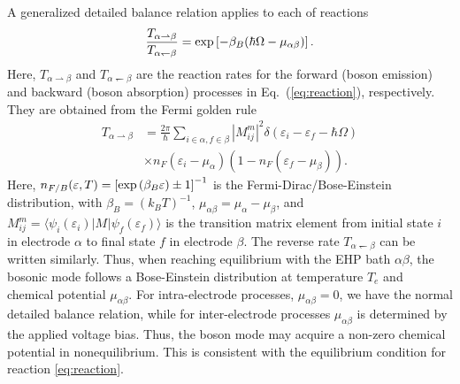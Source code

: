 \documentclass[aps,prb,
,floatfix,footinbib,shortbibliography,
preprint
]{revtex4-1}
\begin{document}
A generalized detailed balance relation applies to each of reactions
\begin{align}
\frac{T_{\alpha\rightharpoonup\beta}}{T_{\alpha\leftharpoondown\beta}} = {\rm exp}\left[-\beta_B(\hbar\Omega-\mu_{\alpha\beta})\right].
\label{eq:db}
\end{align}
Here, $T_{\alpha\rightharpoonup\beta}$ and $T_{\alpha\leftharpoondown\beta}$ are the reaction rates for the forward (boson emission) and backward (boson absorption) processes in Eq.~(\ref{eq:reaction}), respectively. They are obtained from the Fermi golden rule
\begin{align}
T_{\alpha\rightharpoonup\beta} &= \frac{2\pi}{\hbar}\sum_{i\in\alpha,f\in\beta}|M^m_{ij}|^2  \delta(\varepsilon_i-\varepsilon_f-\hbar\Omega)  \nonumber\\
&\times n_F(\varepsilon_i-\mu_\alpha)(1-n_F(\varepsilon_f-\mu_\beta)).
\end{align}
Here, $n_{F/B}(\varepsilon,T) = \left[{\rm exp}\left(\beta_B \varepsilon\right)\pm 1\right]^{-1}$ is the Fermi-Dirac/Bose-Einstein distribution, with $\beta_B=(k_BT)^{-1}$,  $\mu_{\alpha\beta}=\mu_\alpha-\mu_\beta$, and $M^m_{ij}=\langle \psi_{i}(\varepsilon_i)|M^{}|\psi_{f}(\varepsilon_f)\rangle$ is the transition matrix element from initial state $i$ in electrode $\alpha$ to final state $f$ in electrode $\beta$. The reverse rate $T_{\alpha\leftharpoondown\beta}$ can be written similarly.
Thus, when reaching equilibrium with the EHP bath $\alpha\beta$, the bosonic mode follows a Bose-Einstein distribution at temperature $T_e$ and chemical potential $\mu_{\alpha\beta}$. For intra-electrode processes, $\mu_{\alpha\beta}=0$, we have the normal detailed balance relation, while for inter-electrode processes $\mu_{\alpha\beta}$ is determined by the applied voltage bias. Thus, the boson mode may acquire a non-zero chemical potential in nonequilibrium. This is consistent with the equilibrium condition for reaction \ref{eq:reaction}.


\end{document}
